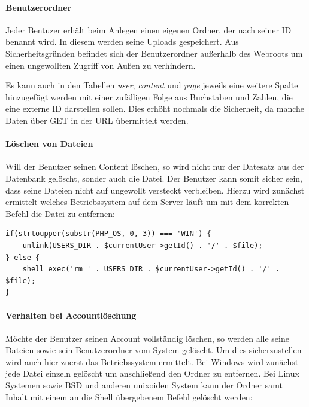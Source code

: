 \documentclass[10.5pt]{scrarticle}
\begin{document}
\paragraph{Benutzerordner}

Jeder Bentuzer erhält beim Anlegen einen eigenen Ordner, der nach seiner ID benannt wird. In diesem werden seine Uploads gespeichert. Aus Sicherheitsgründen befindet sich der Benutzerordner außerhalb des Webroots um einen ungewollten Zugriff von Außen zu verhindern.

\begin{infobox}[Alternative:]
Es kann auch in den Tabellen \textit{user}, \textit{content} und \textit{page} jeweils eine weitere Spalte hinzugefügt werden mit einer zufälligen Folge aus Buchstaben und Zahlen, die eine externe ID darstellen sollen. Dies erhöht nochmals die Sicherheit, da manche Daten über GET in der URL übermittelt werden.
\end{infobox}

\paragraph{Löschen von Dateien}
Will der Benutzer seinen Content löschen, so wird nicht nur der Datesatz aus der Datenbank gelöscht, sonder auch die Datei. Der Benutzer kann somit sicher sein, dass seine Dateien nicht auf ungewollt versteckt verbleiben. Hierzu wird zunächst ermittelt welches Betriebssystem auf dem Server läuft um mit dem korrekten Befehl die Datei zu entfernen:

\lstset{firstnumber=53}
\begin{lstlisting}
if(strtoupper(substr(PHP_OS, 0, 3)) === 'WIN') {
    unlink(USERS_DIR . $currentUser->getId() . '/' . $file);
} else {
    shell_exec('rm ' . USERS_DIR . $currentUser->getId() . '/' . $file);
}
\end{lstlisting}

\paragraph{Verhalten bei Accountlöschung}
Möchte der Benutzer seinen Account vollständig löschen, so werden alle seine Dateien sowie sein Benutzerordner vom System gelöscht. Um dies sicherzustellen wird auch hier zuerst das Betriebssystem ermittelt. Bei Windows wird zunächst jede Datei einzeln gelöscht um anschließend den Ordner zu entfernen. Bei Linux Systemen sowie BSD und anderen unixoiden System kann der Ordner samt Inhalt mit einem an die Shell übergebenem Befehl gelöscht werden:
\end{document}
